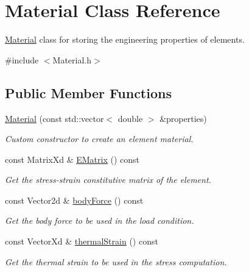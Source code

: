 \hypertarget{class_material}{}\section{Material Class Reference}
\label{class_material}


\mbox{\hyperlink{class_material}{Material}} class for storing the engineering properties of elements.  




{\ttfamily \#include $<$Material.\+h$>$}

\subsection*{Public Member Functions}
\begin{DoxyCompactItemize}
\item 
\mbox{\hyperlink{class_material_aa37938070139aa60f67d245d3b0ce352}{Material}} (const std\+::vector$<$ double $>$ \&properties)
\begin{DoxyCompactList}\small\item\em Custom constructor to create an element material. \end{DoxyCompactList}\item 
const Matrix\+Xd \& \mbox{\hyperlink{class_material_abaae85c04f84374421337e2bf140ec0a}{E\+Matrix}} () const
\begin{DoxyCompactList}\small\item\em Get the stress-\/strain constitutive matrix of the element. \end{DoxyCompactList}\item 
const Vector2d \& \mbox{\hyperlink{class_material_a5995e3b7d8063f670e33f2fcd7315928}{body\+Force}} () const
\begin{DoxyCompactList}\small\item\em Get the body force to be used in the load condition. \end{DoxyCompactList}\item 
const Vector\+Xd \& \mbox{\hyperlink{class_material_ae84dc6468819487050db131b589ffb95}{thermal\+Strain}} () const
\begin{DoxyCompactList}\small\item\em Get the thermal strain to be used in the stress computation. \end{DoxyCompactList}\end{DoxyCompactItemize}
